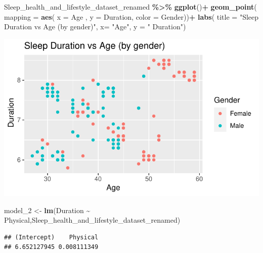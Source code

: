 \documentclass[
  11pt,
]{article}
\newenvironment{Shaded}{\begin{snugshade}}{\end{snugshade}}
\newcommand{\AttributeTok}[1]{\textcolor[rgb]{0.13,0.29,0.53}{#1}}
\newcommand{\FunctionTok}[1]{\textcolor[rgb]{0.13,0.29,0.53}{\textbf{#1}}}
\newcommand{\NormalTok}[1]{#1}
\newcommand{\OtherTok}[1]{\textcolor[rgb]{0.56,0.35,0.01}{#1}}
\newcommand{\SpecialCharTok}[1]{\textcolor[rgb]{0.81,0.36,0.00}{\textbf{#1}}}
\newcommand{\StringTok}[1]{\textcolor[rgb]{0.31,0.60,0.02}{#1}}
\begin{document}
\begin{Shaded}
\begin{Highlighting}[]
\NormalTok{Sleep\_health\_and\_lifestyle\_dataset\_renamed }\SpecialCharTok{\%\textgreater{}\%}
  \FunctionTok{ggplot}\NormalTok{()}\SpecialCharTok{+}
  \FunctionTok{geom\_point}\NormalTok{( }\AttributeTok{mapping =} \FunctionTok{aes}\NormalTok{( }\AttributeTok{x =}\NormalTok{ Age , }\AttributeTok{y =}\NormalTok{ Duration, }\AttributeTok{color =}\NormalTok{ Gender))}\SpecialCharTok{+}
  \FunctionTok{labs}\NormalTok{(}
   \AttributeTok{title =} \StringTok{"Sleep Duration vs Age (by gender)"}\NormalTok{,}
   \AttributeTok{x=} \StringTok{"Age"}\NormalTok{, }\AttributeTok{y =} \StringTok{" Duration"}\NormalTok{)}
\end{Highlighting}
\end{Shaded}

\begin{center}\includegraphics[width=0.7\linewidth]{SleepHelath_files/figure-latex/unnamed-chunk-5-1} \end{center}

\begin{Shaded}
\begin{Highlighting}[]
\NormalTok{model\_2 }\OtherTok{\textless{}{-}} \FunctionTok{lm}\NormalTok{(Duration }\SpecialCharTok{\textasciitilde{}}\NormalTok{ Physical,Sleep\_health\_and\_lifestyle\_dataset\_renamed)}
\end{Highlighting}
\end{Shaded}

\begin{Shaded}
\end{Shaded}

\begin{verbatim}
## (Intercept)    Physical 
## 6.652127945 0.008111349
\end{verbatim}
\end{document}
